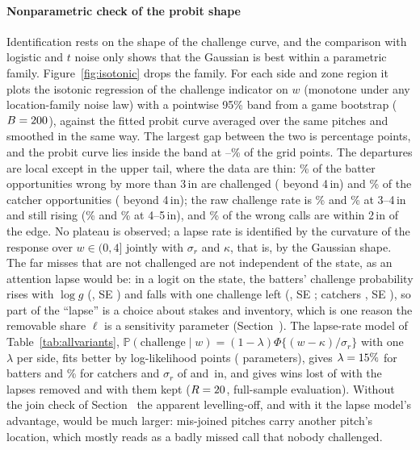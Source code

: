 \documentclass[aoas]{imsart}
\theoremstyle{plain}
\theoremstyle{definition}
\newcommand{\Prob}{\mathbb{P}}
\begin{document}
\paragraph{Nonparametric check of the probit shape} Identification rests on the shape of the challenge curve, and the
comparison with logistic and $t$ noise only shows that the Gaussian is best within a parametric family.
Figure~\ref{fig:isotonic} drops the family. For each side and zone region it plots the isotonic regression of the
challenge indicator on $w$ (monotone under any location-family noise law) with a pointwise 95\% band from a game
bootstrap ($B=200$), against the fitted probit curve averaged over the same pitches and smoothed in the same way.
The largest gap between the two is \IsoMaxGap{} percentage points, and the probit curve lies inside the band at
\IsoBandLo--\IsoBandHi\% of the grid points. The departures are local except in the upper tail, where the data are thin:
\FarRateBatter\% of the \FarNBatter{} batter opportunities wrong by more than 3\,in are challenged (\TailFourBatter{}
beyond 4\,in) and \FarRateCatcher\% of the \FarNCatcher{} catcher opportunities (\TailFourCatcher{} beyond 4\,in); the
raw challenge rate is \TailRateThreeFourBatter\% and \TailRateThreeFourCatcher\% at 3--4\,in and still rising
(\TailRateFourFiveBatter\% and \TailRateFourFiveCatcher\% at 4--5\,in), and \WrongWithinTwoBatter\% of the wrong calls
are within 2\,in of the edge. No plateau is observed; a lapse rate is identified by the curvature of the response over
$w\in(0,4]$ jointly with $\sigma_r$ and $\kappa$, that is, by the Gaussian shape. The far misses that are not challenged
are not independent of the state, as an attention lapse would be: in a logit on the state, the batters' challenge
probability rises with $\log g$ (\FarLogGBatter, SE \FarLogGSEBatter) and falls with one challenge left
(\FarOneLeftBatter, SE \FarOneLeftSEBatter; catchers \FarOneLeftCatcher, SE \FarOneLeftSECatcher), so part of the
``lapse'' is a choice about stakes and inventory, which is one reason the removable share $\ell$ is a sensitivity
parameter (Section~). The lapse-rate model of Table~\ref{tab:allvariants}, $\Prob(\text{challenge}\mid w)=(1-\lambda)\Phi\{(w-\kappa)/\sigma_r\}$
with one $\lambda$ per side, fits better by \LapseDLL{} log-likelihood points (\LapseK{} parameters), gives
$\lambda=15\%$ for batters and \LapseCatcher\% for catchers and $\sigma_r$ of \LapseSrBatter{} and
\LapseSrCatcher\,in, and gives wins lost of \LapseLost{} with the lapses removed and \LapseLostKept{} with them kept
($R=20$, full-sample evaluation). Without the join check of Section~ the apparent levelling-off, and with it the lapse model's advantage,
would be much larger: mis-joined pitches carry another pitch's location, which mostly reads as a badly missed call that
nobody challenged.
\end{document}
